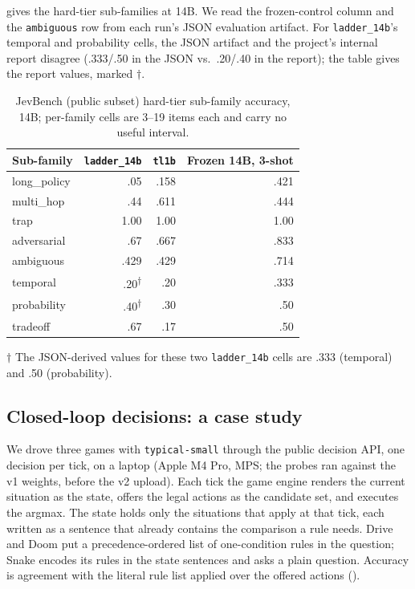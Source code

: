  gives the hard-tier sub-families at 14B. We read the frozen-control column and the
\texttt{ambiguous} row from each run's JSON evaluation artifact. For \texttt{ladder\_14b}'s
temporal and probability cells, the JSON artifact and the project's internal report disagree (.333/.50
in the JSON vs.\ .20/.40 in the report); the table gives the report values, marked $\dagger$.

\begin{table}[h]
  \centering
  \caption{JevBench (public subset) hard-tier sub-family accuracy, 14B;
  per-family cells are 3--19 items each and carry no useful interval.}
  \label{tab:app-hard}
  \small
  \begin{tabular}{lrrr}
    \toprule
    Sub-family & \texttt{ladder\_14b} & \texttt{tl1b} & Frozen 14B, 3-shot \\
    \midrule
    long\_policy & .05 & .158 & .421 \\
    multi\_hop & .44 & .611 & .444 \\
    trap & 1.00 & 1.00 & 1.00 \\
    adversarial & .67 & .667 & .833 \\
    ambiguous & .429 & .429 & .714 \\
    temporal & .20\textsuperscript{$\dagger$} & .20 & .333 \\
    probability & .40\textsuperscript{$\dagger$} & .30 & .50 \\
    tradeoff & .67 & .17 & .50 \\
    \bottomrule
  \end{tabular}

  \vspace{2pt}
  \raggedright\footnotesize $\dagger$ The JSON-derived values for these two \texttt{ladder\_14b} cells
  are .333 (temporal) and .50 (probability).
\end{table}

\subsection{Closed-loop decisions: a case study}
\label{app:closed-loop}

We drove three games with \texttt{typical-small} through the public decision API, one decision per tick,
on a laptop (Apple M4 Pro, MPS; the probes ran against the v1 weights, before the v2 upload). Each tick
the game engine renders the current situation as the state, offers the legal actions as the candidate
set, and executes the argmax. The state holds only the situations that apply at that tick, each written as
a sentence that already contains the comparison a rule needs. Drive and Doom put a precedence-ordered
list of one-condition rules in the question; Snake encodes its rules in the state sentences and asks a
plain question. Accuracy is agreement with the literal rule list applied over the offered actions
().

